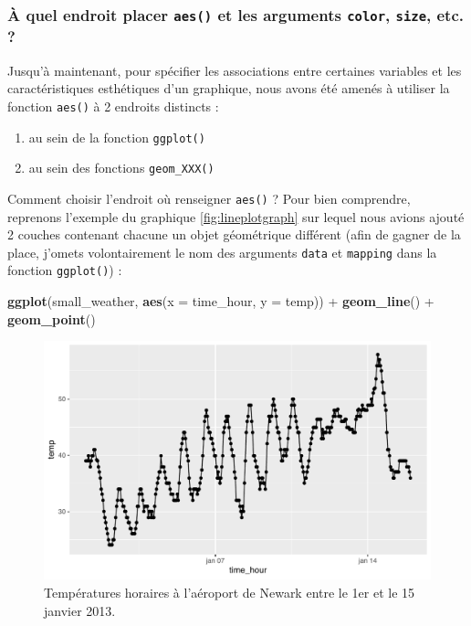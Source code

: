 \documentclass[
  a4paper,
]{article}
\newenvironment{Shaded}{\begin{snugshade}}{\end{snugshade}}
\newcommand{\DataTypeTok}[1]{\textcolor[rgb]{0.00,0.34,0.68}{#1}}
\newcommand{\KeywordTok}[1]{\textcolor[rgb]{0.12,0.11,0.11}{\textbf{#1}}}
\newcommand{\NormalTok}[1]{\textcolor[rgb]{0.12,0.11,0.11}{#1}}
\newcommand{\OperatorTok}[1]{\textcolor[rgb]{0.12,0.11,0.11}{#1}}
\newcommand{\StringTok}[1]{\textcolor[rgb]{0.75,0.01,0.01}{#1}}
\providecommand{\tightlist}{%
  \setlength{\itemsep}{0pt}\setlength{\parskip}{0pt}}
\begin{document}
\hypertarget{uxe0-quel-endroit-placer-aes-et-les-arguments-color-size-etc.}{%
\subsubsection{\texorpdfstring{À quel endroit placer \texttt{aes()} et les arguments \texttt{color}, \texttt{size}, etc. ?}{À quel endroit placer aes() et les arguments color, size, etc. ?}}\label{uxe0-quel-endroit-placer-aes-et-les-arguments-color-size-etc.}}

Jusqu'à maintenant, pour spécifier les associations entre certaines variables et les caractéristiques esthétiques d'un graphique, nous avons été amenés à utiliser la fonction \texttt{aes()} à 2 endroits distincts :

\begin{enumerate}
\def\labelenumi{\arabic{enumi}.}
\tightlist
\item
  au sein de la fonction \texttt{ggplot()}
\item
  au sein des fonctions \texttt{geom\_XXX()}
\end{enumerate}

Comment choisir l'endroit où renseigner \texttt{aes()} ? Pour bien comprendre, reprenons l'exemple du graphique \ref{fig:lineplotgraph} sur lequel nous avions ajouté 2 couches contenant chacune un objet géométrique différent (afin de gagner de la place, j'omets volontairement le nom des arguments \texttt{data} et \texttt{mapping} dans la fonction \texttt{ggplot()}) :

\begin{Shaded}
\begin{Highlighting}[]
\KeywordTok{ggplot}\NormalTok{(small_weather, }\KeywordTok{aes}\NormalTok{(}\DataTypeTok{x =}\NormalTok{ time_hour, }\DataTypeTok{y =}\NormalTok{ temp)) }\OperatorTok{+}
\StringTok{  }\KeywordTok{geom_line}\NormalTok{() }\OperatorTok{+}
\StringTok{  }\KeywordTok{geom_point}\NormalTok{()}
\end{Highlighting}
\end{Shaded}

\begin{figure}[htpb]

{\centering \includegraphics[width=0.9\linewidth]{figure/lineplotgraph2-1} 

}

\caption{Températures horaires à l'aéroport de Newark entre le 1er et le 15 janvier 2013.}\label{fig:lineplotgraph2}
\end{figure}
\end{document}

